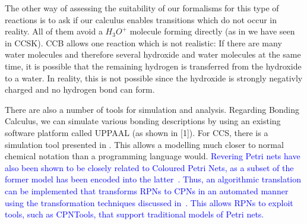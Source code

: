 \documentclass[runningheads]{llncs}
\begin{document}
The other way of assessing the suitability of our formalisms for this type of reactions is to ask
if our calculus enables transitions which do not occur in reality. All of them avoid a $H_3O^+$ molecule forming directly (as in we have seen in CCSK). CCB allows one reaction which is not realistic: If there are many water molecules and therefore several hydroxide and water molecules at the same time, it is possible that the remaining hydrogen is transferred from the hydroxide to a water. In reality, this is not possible since the hydroxide is strongly negativly charged and no hydrogen bond can form.

There are also a number of tools for simulation and analysis. Regarding Bonding Calculus, we can simulate various bonding descriptions by
using an existing software platform called UPPAAL (as shown in [1]). For CCS, there is a simulation tool presented in 
\cite{10.1007/978-3-319-99498-7_8}. This allows a modelling much closer to normal chemical notation than a 
programming language would. \textcolor{blue}{ 
	 Revering Petri nets have also been shown to be closely related to Coloured Petri Nets, as a subset of the former model has been encoded into the latter~\cite{RPNtoCPN}. 
	 Thus, an algorithmic translation can be implemented that transforms RPNs to CPNs in an automated manner using the transformation techniques discussed in~\cite{RPNtoCPN}. This allows RPNs to exploit tools, such as CPNTools, that support traditional models of Petri nets.}


{}

\end{document}
